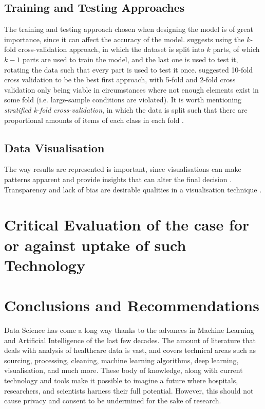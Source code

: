 \documentclass[a4paper,12pt]{article}
\begin{document}
\subsection{Training and Testing Approaches}

The training and testing approach chosen when designing the model is of great importance, since it can affect the accuracy of the model.
\textcite[39]{Consoli2019} suggests using the \(k\)-fold cross-validation approach, in which the dataset is split into \(k\) parts, of which \(k-1\) parts are used to train the model, and the last one is used to test it, rotating the data such that every part is used to test it once. \textcite{Wong2020} suggested 10-fold cross validation to be the best first approach, with 5-fold and 2-fold cross validation only being viable in circumstances where not enough elements exist in some fold (i.e. large-sample conditions are violated). It is worth mentioning \textit{stratified k-fold cross-validation}, in which the data is split such that there are proportional amounts of items of each class in each fold \parencite{Mueller2017}.

\subsection{Data Visualisation}

The way results are represented is important, since visualisations can make patterns apparent and provide insights that can alter the final decision \parencite{Hendriks2019}.
Transparency and lack of bias are desirable qualities in a visualisation technique \parencite{Hendriks2019}.

\section{Critical Evaluation of the case for or against uptake of such Technology}



\section{Conclusions and Recommendations}

Data Science has come a long way thanks to the advances in Machine Learning and Artificial Intelligence of the last few decades. The amount of literature that deals with analysis of healthcare data is vast, and covers technical areas such as sourcing, processing, cleaning, machine learning algorithms, deep learning, visualisation, and much more. These body of knowledge, along with current technology and tools make it possible to imagine a future where hospitals, researchers, and scientists harness their full potential. However, this should not cause privacy and consent to be undermined for the sake of research.

\pagebreak
\printbibliography
\end{document}
